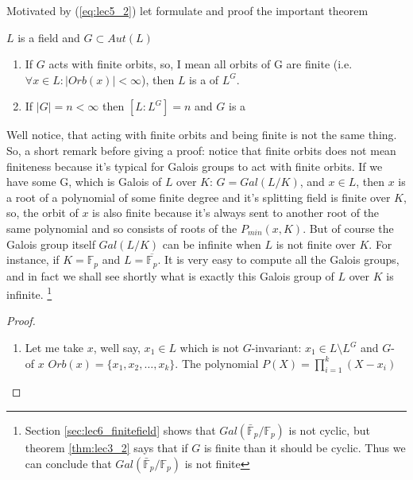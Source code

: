 Motivated by (\ref{eq:lec5_2}) let formulate and proof the important
theorem
\begin{theorem}[Artin]
  $L$ is a field and $G \subset Aut\left(L\right)$
  \begin{enumerate}
  \item If $G$ acts with finite orbits,  so, I mean all orbits of G
    are finite (i.e. $\forall x \in L: \left|Orb(x)\right| < \infty$),
    then $L$ is a  of $L^G$. 
  \item If $\left|G\right| = n < \infty$ then
    $\left[L : L^G\right] = n$ and $G$ is a 
  \end{enumerate}

  \begin{remark}
    Well notice, that acting with finite orbits  and being finite is not
    the same thing. So, a short remark before giving a proof: notice
    that finite orbits does not mean finiteness because it's typical for
    Galois groups to act with finite orbits.  If we have some G, which
    is Galois of $L$ over $K$: $G = Gal\left(L/K\right)$, and
    $x \in L$, then $x$ is a root of a 
    polynomial of some finite degree  and it's splitting field is
    finite over $K$, so, the orbit of $x$ is also finite 
    because it's always sent to another root of the
    same polynomial and so consists of roots of  the
    $P_{min}\left(x, K\right)$. But of course the Galois group itself
    $Gal\left(L/K\right)$ can be infinite when $L$ is not finite over $K$. For
    instance, if  $K  = \mathbb{F}_p$ and $L = \overline{\mathbb{F}_p}$. It is
    very easy to compute all the Galois groups, and in fact we shall see
    shortly what is exactly this Galois group of $L$ over $K$ is infinite.
    \footnote{
      Section \ref{sec:lec6_finitefield} shows that
      $Gal\left(\bar{\mathbb{F}}_p/\mathbb{F}_p\right)$ is not cyclic,
      but theorem \ref{thm:lec3_2} says that if $G$ is finite than it
      should be cyclic. Thus we can conclude that
      $Gal\left(\bar{\mathbb{F}}_p/\mathbb{F}_p\right)$ is not finite
    }
  \end{remark}
  \begin{proof}
    \begin{enumerate}
    \item  Let me take $x$, well say, $x_1 \in L$ which is not
      $G$-invariant: $x_1 \in L \setminus L^G$ and
      $G$- of $x$ 
      $Orb(x) = \{x_1, x_2, \dots, x_k\}$. The
      polynomial $P\left(X\right) = \prod_{i=1}^k\left(X - x_i\right)$

\end{enumerate}
\end{proof}
\end{theorem}
